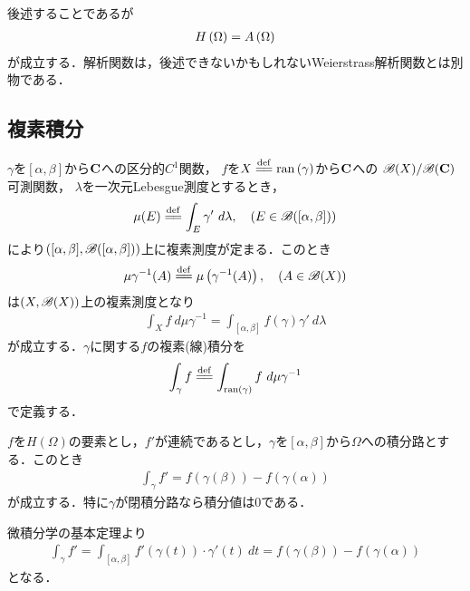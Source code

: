 	後述することであるが
	\begin{align}
		H\left(\Omega\right) = A\left(\Omega\right)
	\end{align}
	が成立する．解析関数は，後述できないかもしれないWeierstrass解析関数とは別物である．
	
\subsection{複素積分}
	$\gamma$を$[\alpha,\beta]$から$\mathbf{C}$への区分的$C^1$関数，
	$f$を$X \defeq \ran{\gamma}$から$\mathbf{C}$への
	$\mathscr{B}(X)/\mathscr{B}(\mathbf{C})$可測関数，
	$\lambda$を一次元Lebesgue測度とするとき，
	\begin{align}
		\mu(E) \defeq \int_E \gamma'\ d\lambda,
		\quad (E \in \borel{[\alpha,\beta]})
	\end{align}
	により$([\alpha,\beta],\mathscr{B}([\alpha,\beta]))$上に複素測度が定まる．このとき
	\begin{align}
		\mu \gamma^{-1}(A) \defeq \mu\left( \gamma^{-1}(A) \right),
		\quad (A \in \borel{X})
	\end{align}
	は$(X,\mathscr{B}(X))$上の複素測度となり
	\begin{align}
		\int_X f\ d\mu \gamma^{-1} = \int_{[\alpha,\beta]} f(\gamma) \gamma'\ d\lambda
	\end{align}
	が成立する．$\gamma$に関する$f$の複素(線)積分を
	\begin{align}
		\int_\gamma f \defeq \int_{\ran{\gamma}} f\ d\mu \gamma^{-1}
	\end{align}
	で定義する．
	
	\begin{screen}
		\begin{thm}[正則関数に対する微積分学の基本定理]
			$f$を$H(\Omega)$の要素とし，$f'$が連続であるとし，$\gamma$を$[\alpha,\beta]$から$\Omega$への積分路とする．このとき
			\begin{align}
				\int_{\gamma} f' = f(\gamma(\beta)) - f(\gamma(\alpha))
			\end{align}
			が成立する．特に$\gamma$が閉積分路なら積分値は$0$である．
		\end{thm}
	\end{screen}
	
	\begin{prf}
		微積分学の基本定理より
		\begin{align}
			\int_{\gamma} f'
			= \int_{[\alpha,\beta]} f'(\gamma(t)) \cdot \gamma'(t)\ dt
			= f(\gamma(\beta)) - f(\gamma(\alpha))
		\end{align}
		となる．
		\QED
	\end{prf}